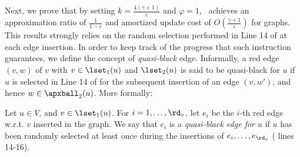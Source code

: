 Next, we prove that by setting $k = \frac{4(\gamma + 1)}{\varepsilon}$ and $\varphi = 1$, \lazyscheme\ achieves an approximation ratio of $\frac{1}{1-\varepsilon}$ and amortized update cost of $O(\frac{\gamma+1}{\varepsilon})$ for \gammaok graphs. This results strongly relies on the random selection performed in Line 14 of  at each edge insertion. In order to keep track of the progress that such instruction guarantees, we define the concept of  \emph{quasi-black} edge. Informally, a red edge $(v,w)$ of $v$ with $v \in \lset_1(u)$ and $\lset_2(u)$ is said to be quasi-black for $u$ if $u$ is selected in Line 14 of  for the subsequent insertion of an edge $(v,w')$, and hence $w \in \apxball_2(u)$. More formally: 

\begin{definition}
Let $u \in V$, and $v \in \lset_1(u)$. For $i=1,\dots,\rd_v$, let $e_i$ be the $i$-th red edge w.r.t. $v$ inserted in the graph. We say that $e_i$ is a \emph{quasi-black edge for $u$} if $u$ has been randomly selected at least once during the insertions of $e_i,\dots,e_{\rd_v}$ ( lines 14-16). 
\end{definition}

